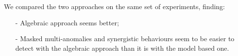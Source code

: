 \documentclass{tikzposter}
\begin{document}
	{
		We compared the two approaches on the same set of experiments, finding:
		\begin{itemize}
			\item[-]{Algebraic approach seems better;}
			\item[-]{Masked multi-anomalies and synergistic behaviours seem to
				be easier to detect with the algebraic approach than it is with
				the model based one.}
		\end{itemize}

		\vspace{5mm}

}
\end{document}
